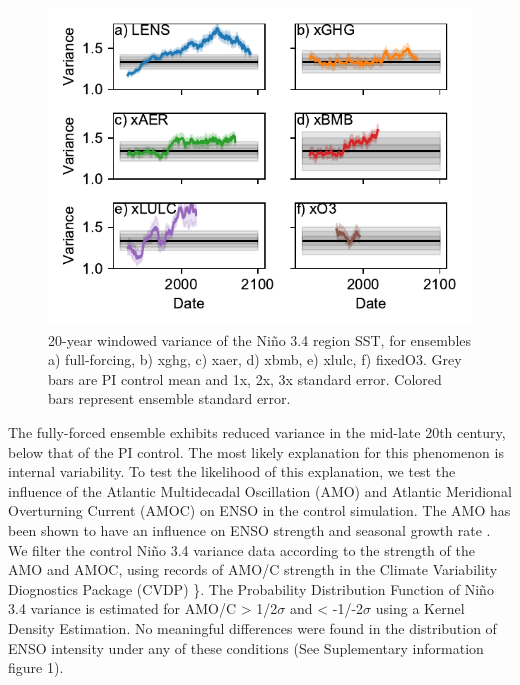 \documentclass[11pt]{article}
\begin{document}
\begin{figure}[htbp]
\centering
\includegraphics[width=.9\linewidth]{./figures/variance_1.pdf}
\caption{\label{fig:variance_1}20-year windowed variance of the Niño 3.4 region SST, for ensembles a) full-forcing, b) xghg, c) xaer, d) xbmb, e) xlulc, f) fixedO3. Grey bars are PI control mean and 1x, 2x, 3x standard error. Colored bars represent ensemble standard error.}
\end{figure}

The fully-forced ensemble exhibits reduced variance in the mid-late 20th century, below that of the PI control. The most likely explanation for this phenomenon is internal variability. To test the likelihood of this explanation, we test the influence of the Atlantic Multidecadal Oscillation (AMO) and Atlantic Meridional Overturning Current (AMOC) on ENSO in the control simulation. The AMO has been shown to have an influence on ENSO strength and seasonal growth rate \citep{levine2017impact}. We filter the control Niño 3.4 variance data according to the strength of the AMO and AMOC, using records of AMO/C strength in the Climate Variability Diognostics Package (CVDP) \citep{phillips2014evaluating}\}. The Probability Distribution Function of Niño 3.4 variance is estimated for AMO/C > 1/2\(\sigma\) and < -1/-2\(\sigma\) using a Kernel Density Estimation. No meaningful differences were found in the distribution of ENSO intensity under any of these conditions (See Suplementary information figure 1).
\end{document}
